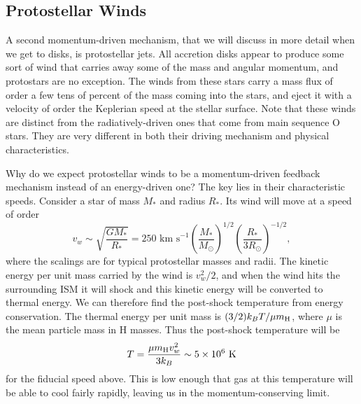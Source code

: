 \subsection{Protostellar Winds}

A second momentum-driven mechanism, that we will discuss in more detail when we get to disks, is protostellar jets. All accretion disks appear to produce some sort of wind that carries away some of the mass and angular momentum, and protostars are no exception. The winds from these stars carry a mass flux of order a few tens of percent of the mass coming into the stars, and eject it with a velocity of order the Keplerian speed at the stellar surface. Note that these winds are distinct from the radiatively-driven ones that come from main sequence O stars. They are very different in both their driving mechanism and physical characteristics.

Why do we expect protostellar winds to be a momentum-driven feedback mechanism instead of an energy-driven one? The key lies in their characteristic speeds. Consider a star of mass $M_*$ and radius $R_*$. Its wind will move at a speed of order
\begin{equation}
v_w \sim \sqrt{\frac{GM_*}{R_*}} = 250\mbox{ km s}^{-1}\left(\frac{M_*}{M_\odot}\right)^{1/2} \left(\frac{R_*}{3R_\odot}\right)^{-1/2},
\end{equation}
where the scalings are for typical protostellar masses and radii. The kinetic energy per unit mass carried by the wind is $v_w^2/2$, and when the wind hits the surrounding ISM it will shock and this kinetic energy will be converted to thermal energy. We can therefore find the post-shock temperature from energy conservation. The thermal energy per unit mass is
$(3/2) k_B T/\mu m_{\rm H}$, where $\mu$ is the mean particle mass in H masses. Thus the post-shock temperature will be
\begin{equation}
T = \frac{\mu m_{\rm H} v_w^2}{3 k_B} \sim 5 \times 10^6\mbox{ K}
\end{equation}
for the fiducial speed above. This is low enough that gas at this temperature will be able to cool fairly rapidly, leaving us in the momentum-conserving limit.

